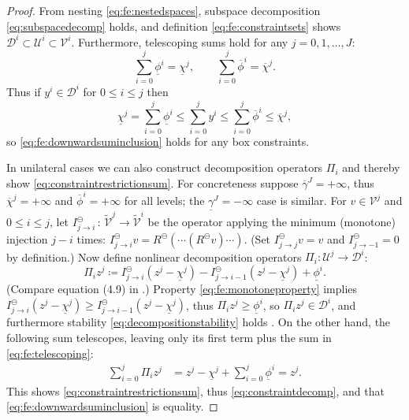 \documentclass[review,hidelinks,onefignum,onetabnum,final]{siamart220329}  %
\newcommand{\cV}{\mathcal{V}}
\newcommand{\minR}{R^{\bm{\ominus}}}
\begin{document}
\begin{proof}  From nesting \eqref{eq:fe:nestedspaces}, subspace decomposition \eqref{eq:subspacedecomp} holds, and definition \eqref{eq:fe:constraintsets} shows $\mathcal{D}^i \subset \mathcal{U}^i \subset \cV^i$.  Furthermore, telescoping sums hold for any $j=0,1,\dots,J$:
\begin{equation}
\sum_{i=0}^j \underline{\phi}^i = \underline{\chi}^j, \qquad \sum_{i=0}^j \overline{\phi}^i = \overline{\chi}^j.  \label{eq:fe:telescoping}
\end{equation}
Thus if $y^i \in \mathcal{D}^i$ for $0 \le i \le j$ then
\begin{equation}
\underline{\chi}^j = \sum_{i=0}^j \underline{\phi}^i \le \sum_{i=0}^j y^i \le \sum_{i=0}^j \overline{\phi}^i \le \overline{\chi}^j, \label{eq:fe:lemmaordering}
\end{equation}
so \eqref{eq:fe:downwardsuminclusion} holds for any box constraints.

In unilateral cases we can also construct decomposition operators $\Pi_i$ and thereby show \eqref{eq:constraintrestrictionsum}.  For concreteness suppose $\overline{\gamma}^J=+\infty$, thus $\overline{\chi}^j=+\infty$ and $\overline{\phi}^i = +\infty$ for all levels; the $\underline{\gamma}^J=-\infty$ case is similar.  For $v\in \mathcal{V}^j$ and $0\le i \le j$, let $I_{j\to i}^\ominus\,:\,\tilde{\cV}^j \to \tilde{\cV}^i$ be the operator applying the minimum (monotone) injection $j-i$ times: $I_{j\to i}^\ominus v = \minR(\cdots(\minR v)\cdots) $.  (Set $I_{j\to j}^\ominus v = v$ and $I_{j\to -1}^\ominus=0$ by definition.)  Now define nonlinear decomposition operators $\Pi_i:\mathcal{U}^j \to \mathcal{D}^i$:
\begin{equation}
\Pi_i z^j \coloneqq I_{j\to i}^\ominus(z^j - \underline{\chi}^j) - I_{j\to i-1}^\ominus(z^j - \underline{\chi}^j) + \underline{\phi}^i.  \label{eq:fe:unilateraldecompositionoperator}
\end{equation}
(Compare equation (4.9) in \cite{GraeserKornhuber2009}.)  Property \eqref{eq:fe:monotoneproperty} implies $I_{j\to i}^\ominus(z^j - \underline{\chi}^j) \ge I_{j\to i-1}^\ominus(z^j - \underline{\chi}^j)$, thus $\Pi_i z^j \ge \underline{\phi}^i$, so $\Pi_i z^j \in \mathcal{D}^i$, and furthermore stability \eqref{eq:decompositionstability} holds \cite[Theorem 4.2]{GraeserKornhuber2009}.  On the other hand, the following sum telescopes, leaving only its first term plus the sum in \eqref{eq:fe:telescoping}:
\begin{align*}
\sum_{i=0}^j \Pi_i z^j &= z^j - \underline{\chi}^j + \sum_{i=0}^j \underline{\phi}^i = z^j.
\end{align*}
This shows \eqref{eq:constraintrestrictionsum}, thus \eqref{eq:constraintdecomp}, and that \eqref{eq:fe:downwardsuminclusion} is equality.
\end{proof}
\end{document}
